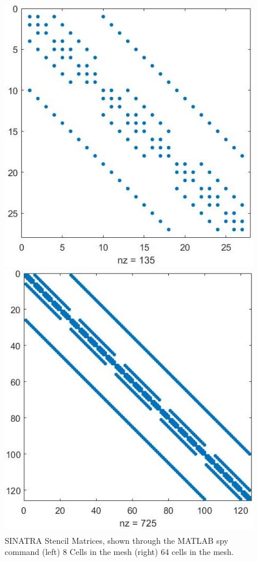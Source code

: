 \begin{figure}
    \centering
  \begin{minipage}[b]{0.49\textwidth}
    \includegraphics[width=\textwidth]{figures/sparse_8.jpg}
  \end{minipage} %
  \begin{minipage}[b]{0.49\textwidth}
    \includegraphics[width=\textwidth]{figures/sparse_64.jpg}
  \end{minipage}
  \caption[Sparse Stencil Matrix]{SINATRA Stencil Matrices, shown through the MATLAB\textsuperscript{\textregistered} spy command (left) 8 Cells in the mesh (right) 64 cells in the mesh.}
  \label{fig:sparse}
\end{figure}


